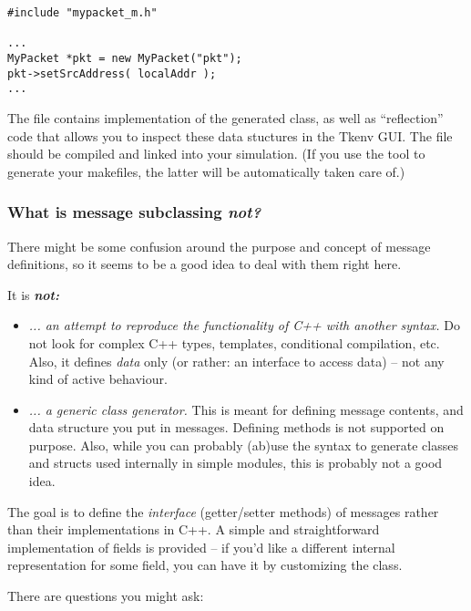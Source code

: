 \begin{verbatim}
#include "mypacket_m.h"

...
MyPacket *pkt = new MyPacket("pkt");
pkt->setSrcAddress( localAddr );
...
\end{verbatim}

The  file contains implementation of the generated 
class, as well as ``reflection'' code that allows you to inspect these data
stuctures in the Tkenv GUI. The  file should be compiled and
linked into your simulation. (If you use the  tool
to generate your makefiles, the latter will be automatically taken care of.)


\subsubsection{What is message subclassing \textit{not?}}

There might be some confusion around the purpose and
concept of message definitions, so it seems to be a good idea
to deal with them right here.

It is \textit{\textbf{not:}}

\begin{itemize}
  \item{\textit{... an attempt to reproduce the functionality of C++ with another
     syntax.} Do not look for complex C++ types, templates, conditional compilation, etc.
     Also, it defines \textit{data} only (or rather: an interface to access
     data) -- not any kind of active behaviour.}
  \item{\textit{... a generic class generator.} This is meant for defining message
     contents, and data structure you put in messages.
     Defining methods is not supported on purpose.
     Also, while you can probably (ab)use the syntax to
     generate classes and structs used internally in simple modules,
     this is probably not a good idea.}
\end{itemize}

The goal is to define the \textit{interface} (getter/setter methods) of messages
rather than their implementations in C++. A simple and straightforward
implementation of fields is provided -- if you'd like a different internal
representation for some field, you can have it by customizing the class.

There are questions you might ask:


